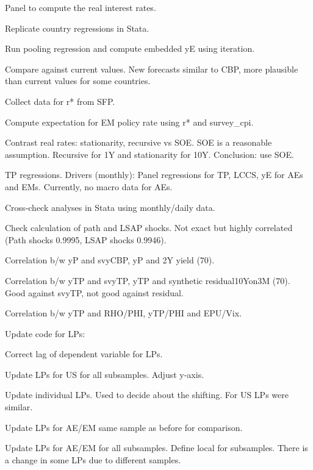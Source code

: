 \documentclass[12pt]{article}
\newcommand{\cmark}{\ding{51}}
\newcommand{\xmark}{\ding{55}}
\newcommand{\done}{\rlap{$\square$}{\raisebox{2pt}{\large\hspace{1pt}\cmark}}%
	\hspace{-2.5pt}}
\newcommand{\wontdo}{\rlap{$\square$}{\large\hspace{1pt}\xmark}}
\begin{document}
\begin{todolist}
	\item[\done] Panel to compute the real interest rates.
	\begin{todolist}
		\item[\done] Replicate country regressions in Stata.
		\item[\done] Run pooling regression and compute embedded yE using iteration. 
		\item[\done] Compare against current values. New forecasts similar to CBP, more plausible than current values for some countries.
		\item[\done] Collect data for r* from SFP.
		\item[\done] Compute expectation for EM policy rate using r* and survey_cpi.
		\item[\done] Contrast real rates: stationarity, recursive vs SOE. SOE is a reasonable assumption. Recursive for 1Y and stationarity for 10Y. Conclusion: use SOE.
	\end{todolist}
	\item[\done] TP regressions. Drivers (monthly): Panel regressions for TP, LCCS, yE for AEs and EMs. Currently, no macro data for AEs.
	\item[\done] Cross-check analyses in Stata using monthly/daily data.
	\begin{todolist}
		\item[\done] Check calculation of path and LSAP shocks. Not exact but highly correlated (Path shocks 0.9995, LSAP shocks 0.9946).
		\item[\done] Correlation b/w yP and svyCBP, yP and 2Y yield (70).
		\item[\done] Correlation b/w yTP and svyTP, yTP and synthetic residual10Yon3M (70). Good against svyTP, not good against residual.
		\item[\done] Correlation b/w yTP and RHO/PHI, yTP/PHI and EPU/Vix.
	\end{todolist}
	\item[\done] Update code for LPs:
	\begin{todolist}
		\item[\done] Correct lag of dependent variable for LPs.
		\item[\done] Update LPs for US for all subsamples. Adjust y-axis. 
		\item[\wontdo] Update individual LPs. Used to decide about the shifting. For US LPs were similar.
		\item[\done] Update LPs for AE/EM same sample as before for comparison.
		\item[\done] Update LPs for AE/EM for all subsamples. Define local for subsamples. There is a change in some LPs due to different samples.

\end{todolist}
\end{todolist}
\end{document}
